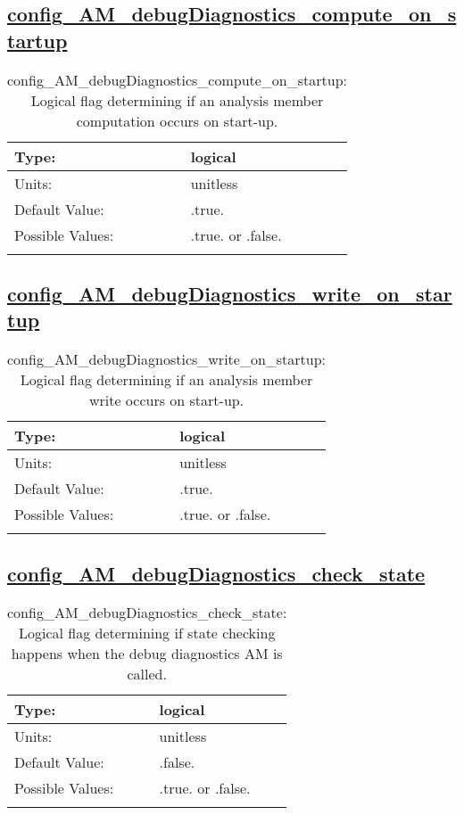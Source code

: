 \subsection[config\_AM\_debugDiagnostics\_compute\_on\_startup]{\hyperref[sec:nm_tab_AM_debugDiagnostics]{config\_AM\_debugDiagnostics\_compute\_on\_startup}}
\label{subsec:nm_sec_config_AM_debugDiagnostics_compute_on_startup}
\begin{center}
\begin{longtable}{| p{2.0in} || p{4.0in} |}
    \hline
    Type: & logical \\
    \hline
    Units: & \si{unitless} \\
    \hline
    Default Value: & .true. \\
    \hline
    Possible Values: & .true. or .false. \\
    \hline
    \caption{config\_AM\_debugDiagnostics\_compute\_on\_startup: Logical flag determining if an analysis member computation occurs on start-up.}
\end{longtable}
\end{center}
\subsection[config\_AM\_debugDiagnostics\_write\_on\_startup]{\hyperref[sec:nm_tab_AM_debugDiagnostics]{config\_AM\_debugDiagnostics\_write\_on\_startup}}
\label{subsec:nm_sec_config_AM_debugDiagnostics_write_on_startup}
\begin{center}
\begin{longtable}{| p{2.0in} || p{4.0in} |}
    \hline
    Type: & logical \\
    \hline
    Units: & \si{unitless} \\
    \hline
    Default Value: & .true. \\
    \hline
    Possible Values: & .true. or .false. \\
    \hline
    \caption{config\_AM\_debugDiagnostics\_write\_on\_startup: Logical flag determining if an analysis member write occurs on start-up.}
\end{longtable}
\end{center}
\subsection[config\_AM\_debugDiagnostics\_check\_state]{\hyperref[sec:nm_tab_AM_debugDiagnostics]{config\_AM\_debugDiagnostics\_check\_state}}
\label{subsec:nm_sec_config_AM_debugDiagnostics_check_state}
\begin{center}
\begin{longtable}{| p{2.0in} || p{4.0in} |}
    \hline
    Type: & logical \\
    \hline
    Units: & \si{unitless} \\
    \hline
    Default Value: & .false. \\
    \hline
    Possible Values: & .true. or .false. \\
    \hline
    \caption{config\_AM\_debugDiagnostics\_check\_state: Logical flag determining if state checking happens when the debug diagnostics AM is called.}
\end{longtable}
\end{center}
